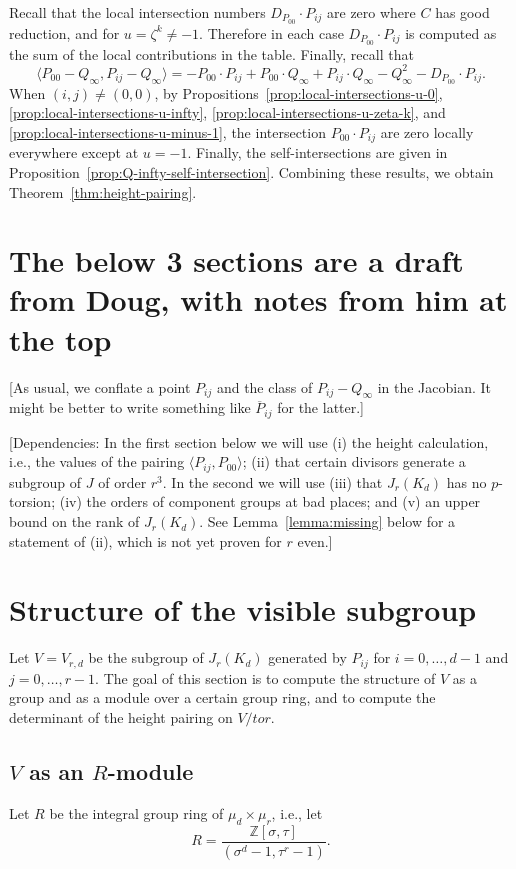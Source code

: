 \documentclass[reqno]{amsart}
\theoremstyle{definition}
\theoremstyle{remark}
\def\Z{\mathbb{Z}}
\begin{document}
Recall that the local intersection numbers $D_{P_{00}} \cdot P_{ij}$ are zero where $C$ has good reduction, and for $u = \zeta^k \neq -1$. Therefore in each case $D_{P_{00}} \cdot P_{ij}$ is computed as the sum of the local contributions in the table. Finally, recall that
\[
\langle {P_{00}} - Q_\infty, P_{ij} - Q_\infty\rangle = -{P_{00}} \cdot P_{ij} + {P_{00}} \cdot Q_\infty + P_{ij} \cdot Q_\infty - Q_\infty^2 - D_{P_{00}} \cdot P_{ij}.
\]
When $(i,j) \neq (0,0)$, by Propositions~\ref{prop:local-intersections-u-0}, \ref{prop:local-intersections-u-infty}, \ref{prop:local-intersections-u-zeta-k}, and \ref{prop:local-intersections-u-minus-1}, the intersection $P_{00} \cdot P_{ij}$ are zero locally everywhere except at $u = -1$. Finally, the self-intersections are given in Proposition~\ref{prop:Q-infty-self-intersection}. Combining these results, we obtain Theorem~\ref{thm:height-pairing}.





\section*{The below 3 sections are a draft from Doug, with notes from him at the top}

[As usual, we conflate a point $P_{ij}$ and the class of
$P_{ij}-Q_\infty$ in the Jacobian.  It might be better to write
something like $\overline P_{ij}$ for the latter.]

[Dependencies: In the first section below we will use (i) the height
calculation, i.e., the values of the pairing $\langle
P_{ij},P_{00}\rangle$; (ii) that certain divisors generate a subgroup
of $J$ of order $r^3$.  In the second we will use (iii) that
$J_r(K_d)$ has no $p$-torsion; (iv) the orders of component groups at
bad places; and (v) an upper bound on the rank of $J_r(K_d)$.  See
Lemma~\ref{lemma:missing} below for a statement of (ii), which is not
yet proven for $r$ even.]


\section{Structure of the visible subgroup}
Let $V=V_{r,d}$ be the subgroup of $J_r(K_d)$ generated by $P_{ij}$
for $i=0,\dots,d-1$ and $j=0,\dots,r-1$.  The goal of this section is
to compute the structure of $V$ as a group and as a module over
a certain group ring, and to compute the determinant of the height
pairing on $V/tor$.

\subsection{$V$ as an $R$-module}
Let $R$ be the integral group ring of $\mu_d\times\mu_r$, i.e., let
$$R=\frac{\Z[\sigma,\tau]}{(\sigma^d-1,\tau^r-1)}.$$
\end{document}
